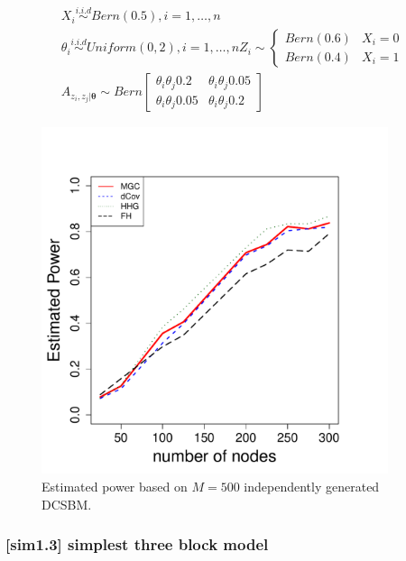 \documentclass[12pt]{article}
\theoremstyle{definition}
\begin{document}
\begin{equation}
\label{eq:twoSBM}
\begin{gathered}
X_{i} \overset{i.i.d}{\sim} Bern(0.5), i = 1, \ldots , n \\ 
\theta_{i} \overset{i.i.d}{\sim} Uniform(0,2), i = 1, \ldots, n
Z_{i}  \sim  \left\{  \begin{array}{cc} Bern(0.6) & X_{i} = 0 \\ Bern(0.4) & X_{i} = 1  \end{array} \right. \\
A_{z_{i}, z_{j} | \mathbf{\theta}} \sim Bern \left[  \begin{array}{cc}  \theta_{i} \theta_{j} 0.2 &  \theta_{i} \theta_{j} 0.05  \\  \theta_{i} \theta_{j} 0.05 &  \theta_{i} \theta_{j} 0.2 \end{array}  \right]
\end{gathered}
\end{equation}

\begin{figure}[H]
	\centering
	\label{fig:ame}
	\includegraphics[width=4in]{../Figure/tmp_dcSBM.pdf}
	\caption{Estimated power based on $M = 500$ independently generated DCSBM.}
\end{figure}	

	
	
	
\subsubsection{[sim1.3] simplest three block model}
	
\end{document}

